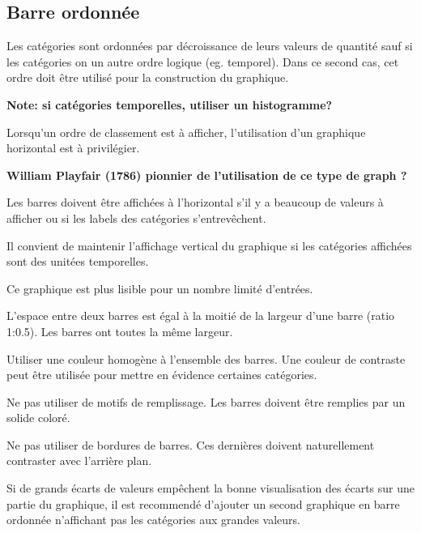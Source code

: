 \documentclass[a4paper,12pt]{article}
\begin{document}
\begin{multicols}{2}
\subsection*{Barre ordonnée}
\label{sec:org6f86843}
Les catégories sont ordonnées par décroissance de leurs valeurs de quantité\autocite{jonathanschwabishComparingCategories2021} sauf si les catégories on un autre ordre logique (eg. temporel). Dans ce second cas, cet ordre doit être utilisé pour la construction du graphique. \autocite{wilkeVisualizingAmounts2019}

\textbf{Note: si catégories temporelles, utiliser un histogramme?}

Lorsqu'un ordre de classement est à afficher, l'utilisation d'un graphique horizontal est à privilégier. \autocite{andreaskrauseBestPracticesData2024}

\textbf{William Playfair (1786) pionnier de l'utilisation de ce type de graph ?}

Les barres doivent être affichées à l'horizontal s'il y a beaucoup de valeurs à afficher ou si les labels des catégories s'entrevêchent. \autocite{alansmithLexiqueVisuel,sosulskiGraphics2019,wilkeVisualizingAmounts2019,stephenfewComponentlevelGraphDesign2012,jonathanschwabishComparingCategories2021}

Il convient de maintenir l'affichage vertical du graphique si les catégories affichées sont des unitées temporelles. \autocite{stephenfewComponentlevelGraphDesign2012}

Ce graphique est plus lisible pour un nombre limité d'entrées. \autocite{mikeyiHowChooseRight2020}

L'espace entre deux barres est égal à la moitié de la largeur d'une barre (ratio 1:0.5). Les barres ont toutes la même largeur. \autocite{stephenfewComponentlevelGraphDesign2012}

Utiliser une couleur homogène à l'ensemble des barres. Une couleur de contraste peut être utilisée pour mettre en évidence certaines catégories.

Ne pas utiliser de motifs de remplissage. Les barres doivent être remplies par un solide coloré. \autocite{stephenfewComponentlevelGraphDesign2012}

Ne pas utiliser de bordures de barres. Ces dernières doivent naturellement contraster avec l'arrière plan.

Si de grands écarts de valeurs empêchent la bonne visualisation des écarts sur une partie du graphique, il est recommendé d'ajouter un second graphique en barre ordonnée n'affichant pas les catégories aux grandes valeurs. \autocite{jonathanschwabishComparingCategories2021}


\end{multicols}
\end{document}
